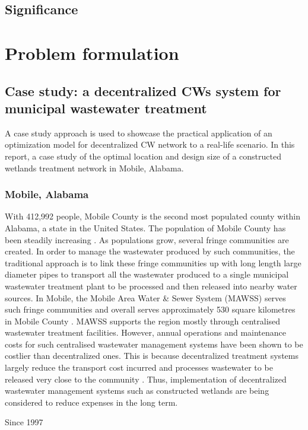 \documentclass[preprint,12pt,authoryear]{elsarticle}
\begin{document}
\subsection{Significance}

\section{Problem formulation}\label{section:problem}
\subsection{Case study: a decentralized CWs system for municipal wastewater treatment}
A case study approach is used to showcase the practical application of an optimization model for decentralized CW network to a real-life scenario. In this report, a case study of the optimal location and design size of a constructed wetlands treatment network in Mobile, Alabama.

\subsubsection{Mobile, Alabama}
With 412,992 people, Mobile County is the second most populated county within Alabama, a state in the United States. The population of Mobile County has been steadily increasing \citep{uscb2002census}. As populations grow, several fringe communities are created. In order to manage the wastewater produced by such communities, the traditional approach is to link these fringe communities up with long length large diameter pipes to transport all the wastewater produced to a single municipal wastewater treatment plant to be processed and then released into nearby water sources. In Mobile, the Mobile Area Water \& Sewer System (MAWSS) serves such fringe communities and overall serves approximately 530 square kilometres in Mobile County \citep{mawss2015}. MAWSS supports the region mostly through centralised wastewater treatment facilities. However, annual operations and maintenance costs for such centralised wastewater management systems have been shown to be costlier than decentralized ones. This is because decentralized treatment systems largely reduce the transport cost incurred and processes wastewater to be released very close to the community \citep{mawss2015}. Thus, implementation of decentralized wastewater management systems such as constructed wetlands are being considered to reduce expenses in the long term. 

Since 1997 
\end{document}
